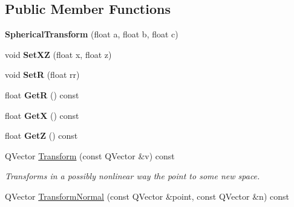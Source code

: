 \subsection*{Public Member Functions}
\begin{DoxyCompactItemize}
\item 
{\bfseries Spherical\+Transform} (float a, float b, float c)\hypertarget{classSphericalTransform_a07a35bf37881e516a4398549828cd116}{}\label{classSphericalTransform_a07a35bf37881e516a4398549828cd116}

\item 
void {\bfseries Set\+XZ} (float x, float z)\hypertarget{classSphericalTransform_aafaefeaec18858c6771d4580848f1059}{}\label{classSphericalTransform_aafaefeaec18858c6771d4580848f1059}

\item 
void {\bfseries SetR} (float rr)\hypertarget{classSphericalTransform_ab4b551608e2131031b0ff010f279222e}{}\label{classSphericalTransform_ab4b551608e2131031b0ff010f279222e}

\item 
float {\bfseries GetR} () const \hypertarget{classSphericalTransform_a1a2e185fa2cde0cf85c9c548fdf6f5e4}{}\label{classSphericalTransform_a1a2e185fa2cde0cf85c9c548fdf6f5e4}

\item 
float {\bfseries GetX} () const \hypertarget{classSphericalTransform_a5e67dff38264d593e8c559dfe6fc45f4}{}\label{classSphericalTransform_a5e67dff38264d593e8c559dfe6fc45f4}

\item 
float {\bfseries GetZ} () const \hypertarget{classSphericalTransform_a808d510276d6dad5a9c4c95f6fd63c65}{}\label{classSphericalTransform_a808d510276d6dad5a9c4c95f6fd63c65}

\item 
Q\+Vector \hyperlink{classSphericalTransform_a0bb191ad75182945a1e337fd662d15a9}{Transform} (const Q\+Vector \&v) const \hypertarget{classSphericalTransform_a0bb191ad75182945a1e337fd662d15a9}{}\label{classSphericalTransform_a0bb191ad75182945a1e337fd662d15a9}

\begin{DoxyCompactList}\small\item\em Transforms in a possibly nonlinear way the point to some new space. \end{DoxyCompactList}\item 
Q\+Vector \hyperlink{classSphericalTransform_aca2f3328d4b174c17baa6cc91077654f}{Transform\+Normal} (const Q\+Vector \&point, const Q\+Vector \&n) const \hypertarget{classSphericalTransform_aca2f3328d4b174c17baa6cc91077654f}{}\label{classSphericalTransform_aca2f3328d4b174c17baa6cc91077654f}


\end{DoxyCompactItemize}
